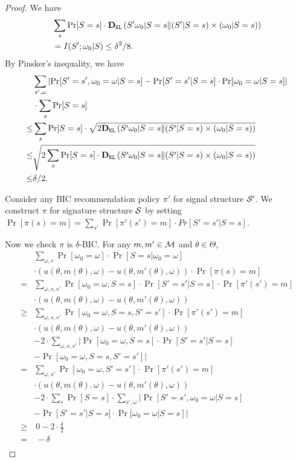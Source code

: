 \begin{proof}
We have
\begin{align*}
&\sum_{s} \Pr[S=s] \cdot \DKL\left(S'\omega_0|S=s \| (S'|S=s) \times (\omega_0|S=s) \right) \\
&= I(S' ; \omega_0|S) \leq \delta^2/8.
\end{align*}
By Pinsker's inequality, we have
\begin{align*}
       & \sum_{s', \omega} \left| \Pr[S' = s', \omega_0 = \omega| S= s] - \Pr[S'=s'|S=s] \cdot \Pr[\omega_0 = \omega|S=s]\right| \\
       &\cdot \sum_{s} \Pr[S = s] \\
\leq & \sum_{s} \Pr[S=s] \cdot \sqrt{2 \DKL\left(S'\omega_0|S=s \| (S'|S=s) \times (\omega_0|S=s) \right)  } \\
\leq &  \sqrt{2 \sum_{s} \Pr[S=s] \cdot  \DKL\left(S'\omega_0|S=s \| (S'|S=s) \times (\omega_0|S=s) \right) } \\
\leq &\delta /2. \\
\end{align*}

Consider any BIC recommendation policy $\pi'$ for signal structure $\S'$. We construct $\pi$ for signature structure $\S$ by setting $\Pr[\pi(s) = m] = \sum_{s'} \Pr[\pi'(s') = m] \cdot Pr[S' = s'|S = s]$.

Now we check $\pi$ is $\delta$-BIC. For any $m,m' \in \M$ and $\theta \in \varTheta$,
\begin{align*}
& \sum_{\omega,s} \Pr[\omega_0= \omega] \cdot \Pr[S = s | \omega_0 = \omega] \\
&\cdot \left(u(\theta, m(\theta), \omega) - u(\theta, m'(\theta), \omega)\right) 
\cdot  \Pr[\pi(s) = m] \\
=&\sum_{\omega,s,s'} \Pr[\omega_0 = \omega, S = s] \cdot \Pr[ S'=s'|S= s] \cdot \Pr[\pi'(s') = m]   \\
&\cdot \left(u(\theta, m(\theta), \omega) - u(\theta, m'(\theta), \omega)\right)\\
\geq &\sum_{\omega,s,s'} \Pr[\omega_0 = \omega, S = s, S'=s'] \cdot \Pr[\pi'(s') = m]   \\
&\cdot \left(u(\theta, m(\theta), \omega) - u(\theta, m'(\theta),
 \omega)\right)\\
& -2 \cdot \sum_{\omega,s,s'} | \Pr[\omega_0 = \omega, S = s] \cdot \Pr[ S'=s'|S= s]\\
& -  \Pr[\omega_0 = \omega, S = s, S'=s']| \\
= &\sum_{\omega,s'} \Pr[\omega_0 = \omega, S'=s'] \cdot \Pr[\pi'(s') = m]  \\
& \cdot \left(u(\theta, m(\theta), \omega) - u(\theta, m'(\theta),
 \omega)\right)\\
& -2 \cdot \sum_{s} \Pr[S = s] \cdot  \sum_{s', \omega} | \Pr[S' = s', \omega_0 = \omega| S= s] \\
&- \Pr[S'=s'|S=s] \cdot \Pr[\omega_0 = \omega|S=s]| \\
\geq&  ~0- 2 \cdot \frac{\delta}{2}\\
 =& ~-\delta\\
\end{align*}


\end{proof}
